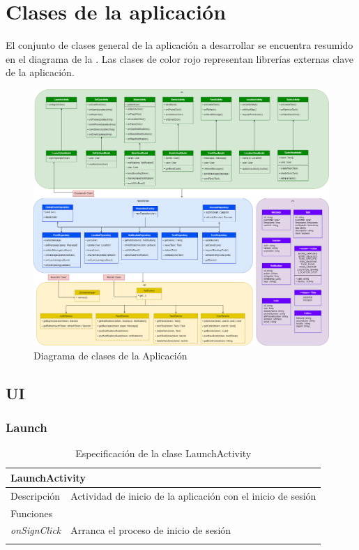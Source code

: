 \section{Clases de la aplicación}

El conjunto de clases general de la aplicación a desarrollar se encuentra resumido en el diagrama de la . Las clases de color rojo representan librerías externas clave de la aplicación.

\begin{figure}[H]
    \includegraphics[width=1\textwidth]{images/Analisis/AnalisisDiagramaClasesApp.drawio.png}
    \caption{Diagrama de clases de la Aplicación}
    \label{fig:diagrama_clases_app}
\end{figure}

\subsection{UI}

\vspace{-5pt}
\subsubsection{Launch}

\begin{longtable}{|p{} p{}|}
    \hline
    \multicolumn{2}{|l|}{LaunchActivity} \\ \hline \hline
    Descripción      & Actividad de inicio de la aplicación con el inicio de sesión \\ \hline
    \multicolumn{2}{|l|}{Funciones} \\
    \emph{onSignClick}  & Arranca el proceso de inicio de sesión  \\ \hline
    \caption{Especificación de la clase LaunchActivity}
    \label{class:app:launch_activity}
\end{longtable}

